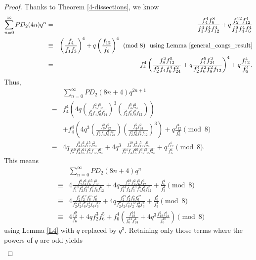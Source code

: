 \documentclass{amsart}
\begin{document}
\begin{proof}
Thanks to Theorem \ref{4-dissections}, we know 
\begin{eqnarray}
\sum_{n=0}^\infty PD_2(4n)q^n 
&=& 
\frac{f_4^4f_6^8}{f_1^4f_3^4f_{12}^4} + q\frac{f_2^{12}f_{12}^4}{f_1^8f_4^4f_6^4} \notag \\
&\equiv & 
\left( \frac{f_4}{f_1f_3} \right)^4 + q\left( \frac{f_{12}}{f_6} \right)^4 \pmod{8} \ \ \textrm{using Lemma \ref{general_congs_result}} \label{4n_mod8_overall}\\
&=& 
f_4^4\left( \frac{f_8^2f_{12}^5}{f_2^2f_4f_6^4f_{24}^2} + q \frac{f_4^5f_{24}^2}{f_2^4f_6^2f_8^2f_{12}}  \right)^4 + q\frac{f_{12}^4}{f_6^4}. \label{4n_mod8}
\end{eqnarray}
Thus, 
\begin{eqnarray*}
&&
\sum_{n=0}^\infty PD_2(8n+4)q^{2n+1} \\
&\equiv &  
f_4^4\left( 4q\left( \frac{f_8^2f_{12}^5}{f_2^2f_4f_6^4f_{24}^2}\right)^3\left( \frac{f_4^5f_{24}^2}{f_2^4f_6^2f_8^2f_{12}} \right)\right) \\
&& + f_4^4\left( 4q^3\left( \frac{f_8^2f_{12}^5}{f_2^2f_4f_6^4f_{24}^2}\right)\left( \frac{f_4^5f_{24}^2}{f_2^4f_6^2f_8^2f_{12}} \right)^3\right) + q\frac{f_{12}^4}{f_6^4} \pmod{8} \\
&\equiv &  
4q\frac{f_4^9f_8^6f_{12}^{15}f_{24}^2}{f_2^{10}f_4^3f_6^{14}f_8^2f_{12}f_{24}^6}  + 4q^3 \frac{f_4^{19}f_8^2f_{12}^5f_{24}^6}{f_2^{14}f_4f_6^{10}f_8^6f_{12}^3f_{24}^2} + q\frac{f_{12}^4}{f_6^4} \pmod{8}.
\end{eqnarray*}
This means 
\begin{eqnarray*}
&&
\sum_{n=0}^\infty PD_2(8n+4)q^{n} \\
&\equiv &  
4\frac{f_2^9f_4^6f_{6}^{15}f_{12}^2}{f_1^{10}f_2^3f_3^{14}f_4^2f_6f_{12}^{6}}  + 4q \frac{f_2^{19}f_4^2f_{6}^5f_{12}^6}{f_1^{14}f_2f_3^{10}f_4^6f_{6}^3f_{12}^2} + \frac{f_{6}^4}{f_3^4} \pmod{8} \\
&\equiv & 
4\frac{f_2^9f_2^{12}f_{6}^{15}f_{6}^4}{f_2^{5}f_2^3f_6^{7}f_2^4f_6f_{6}^{12}}  + 4q \frac{f_2^{19}f_2^4f_{6}^5f_{6}^{12}}{f_2^{7}f_2f_6^{5}f_2^{12}f_{6}^3f_{6}^4} + \frac{f_{6}^4}{f_3^4} \pmod{8} \\
&\equiv & 
4\frac{f_2^9}{f_6} + 4qf_2^3f_6^5 + f_6^4\left( \frac{f_{12}^{14}}{f_6^{14}f_{24}^4} + 4q^3 \frac{f_{12}^2f_{24}^4}{f_6^{10}} \right)  \pmod{8}
\end{eqnarray*}
using Lemma \ref{L4} with $q$ replaced by $q^3.$  Retaining only those terms where the powers of $q$ are odd yields 
\begin{eqnarray*}

\end{eqnarray*}
\end{proof}
\end{document}
